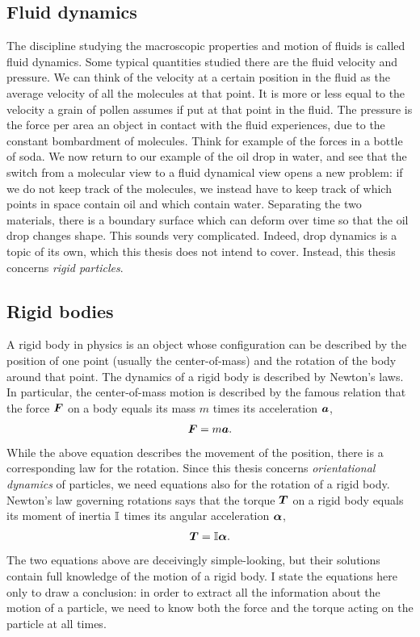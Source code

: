 \documentclass[thesis.tex]{subfiles}
\begin{document}
\subsection*{Fluid dynamics}

The discipline studying the macroscopic properties and motion of fluids is called fluid dynamics. Some typical quantities studied there are the fluid velocity and pressure. We can think of the velocity at a certain position in the fluid as the average velocity of all the molecules at that point. It is more or less equal to the velocity a grain of pollen assumes if put at that point in the fluid. The pressure is the force per area an object in contact with the fluid experiences, due to the constant bombardment of molecules. Think for example of the forces in a bottle of soda. We now return to our example of the oil drop in water, and see that the switch from a molecular view to a fluid dynamical view opens a new problem: if we do not keep track of the molecules, we instead have to keep track of which points in space contain oil and which contain water. Separating the two materials, there is a boundary surface which can deform over time so that the oil drop changes shape. This sounds very complicated. Indeed, drop dynamics is a topic of its own, which this thesis does not intend to cover. Instead, this thesis concerns \emph{rigid particles}. 

\subsection*{Rigid bodies}

A rigid body in physics is an object whose configuration can be described by the position of one point (usually the center-of-mass) and the rotation of the body around that point. The dynamics of a rigid body is described by Newton's laws. In particular, the center-of-mass motion is described by the famous relation that the force $\mbox{\boldmath$F$}$ on a body equals its mass $m$ times its acceleration $\mbox{\boldmath$a$}$,
\begin{align*}
	\mbox{\boldmath$F$} = m\mbox{\boldmath$a$}.
\end{align*}
While the above equation describes the movement of the position, there is a corresponding law for the rotation. Since this thesis concerns \emph{orientational dynamics} of particles, we need equations also for the rotation of a rigid body. Newton's law governing rotations says that the torque $\mbox{\boldmath$T$}$ on a rigid body equals its moment of inertia $\mathbb{I}$ times its angular acceleration $\mbox{\boldmath$\alpha$}$,
\begin{align*}
	\mbox{\boldmath$T$} = \mathbb{I} \mbox{\boldmath$\alpha$}.
\end{align*}
The two equations above are deceivingly simple-looking, but their solutions contain full knowledge of the motion of a rigid body. I state the equations here only to draw a conclusion: in order to extract all the information about the motion of a particle, we need to know both the force and the torque acting on the particle at all times.
\end{document}
